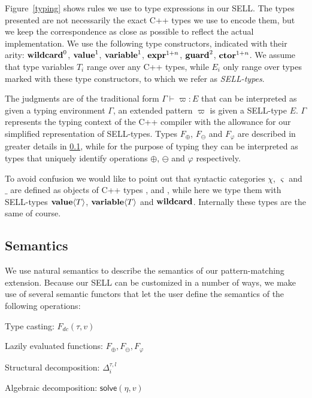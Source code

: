 Figure~\ref{typing} shows rules we use to type expressions in our SELL. The 
types presented are not necessarily the exact C++ types we use to encode them, 
but we keep the correspondence as close as possible to reflect the actual 
implementation. We use the following type constructors, indicated with their 
arity: $\mathit{\bf wildcard}^0$, $\mathit{\bf value}^1$, $\mathit{\bf variable}^1$, $\mathit{\bf expr}^{1+n}$, $\mathit{\bf guard}^2$, 
$\mathit{\bf ctor}^{1+n}$. We assume that type variables $T_i$ range over any C++ types, 
while $E_i$ only range over types marked with these type constructors, to which 
we refer as \emph{SELL-types}.

The judgments are of the traditional form $\Gamma\vdash \varpi : E$ that can be 
interpreted as given a typing environment $\Gamma$, an extended pattern $\varpi$ is 
given a SELL-type $E$. $\Gamma$ represents the typing context of the C++ 
compiler with the allowance for our simplified representation of SELL-types.
Types $F_\oplus$, $F_\ominus$ and $F_\varphi$ are described in greater details 
in \textsection\ref{sec:sem}, while for the purpose of typing they can be 
interpreted as types that uniquely identify operations $\oplus$, $\ominus$ and 
$\varphi$ respectively.

To avoid confusion we would like to point out that syntactic categories $\chi$, 
$\varsigma$ and $\_$ are defined as objects of C++ types , 
 and , while here we type them with SELL-types 
$\mathit{\bf value}\langle{T}\rangle$, $\mathit{\bf variable}\langle{T}\rangle$ and $\mathit{\bf wildcard}$. Internally these types are the same 
of course.

\subsection{Semantics}
\label{sec:sem}

We use natural semantics\cite{Kahn87} to describe the semantics of our 
pattern-matching extension. Because our SELL can be customized in a number of 
ways, we make use of several semantic functors that let the user define the 
semantics of the following operations:

\begin{compactitem}
\setlength{\itemsep}{0pt}
\setlength{\parskip}{0pt}
\item Type casting: $F_{dc}(\tau,v)$
\item Lazily evaluated functions: $F_\oplus,F_\ominus,F_\varphi$
\item Structural decomposition: $\Delta_i^{\tau,l}$
\item Algebraic decomposition: $\mathsf{solve}(\eta,v)$
\end{compactitem}

